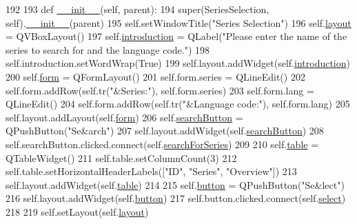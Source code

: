 \begin{DoxyCode}
192 
193         \textcolor{keyword}{def }\hyperlink{classmovies2hdd_1_1gui_1_1_series_selection_aa7aee53dd5df33e036a5bbffe99a903b}{\_\_init\_\_}(self, parent):
194             super(SeriesSelection, self).\hyperlink{classmovies2hdd_1_1gui_1_1_series_selection_aa7aee53dd5df33e036a5bbffe99a903b}{\_\_init\_\_}(parent)
195             self.setWindowTitle(\textcolor{stringliteral}{"Series Selection"})
196             self.\hyperlink{classmovies2hdd_1_1gui_1_1_series_selection_a1d4759f70508c7fbcbf5ce849d6cee76}{layout} = QVBoxLayout()
197             self.\hyperlink{classmovies2hdd_1_1gui_1_1_series_selection_ae741cee9fe3b6d64c1e62413c063d7b1}{introduction} = QLabel(\textcolor{stringliteral}{"Please enter the name of the series to search for and
       the language code."})
198             self.introduction.setWordWrap(\textcolor{keyword}{True})
199             self.layout.addWidget(self.\hyperlink{classmovies2hdd_1_1gui_1_1_series_selection_ae741cee9fe3b6d64c1e62413c063d7b1}{introduction})
200             self.\hyperlink{classmovies2hdd_1_1gui_1_1_series_selection_a514dd2b23706781594fe9d9886a28218}{form} = QFormLayout()
201             self.form.series = QLineEdit()
202             self.form.addRow(self.tr(\textcolor{stringliteral}{"&Series:"}), self.form.series)
203             self.form.lang = QLineEdit()
204             self.form.addRow(self.tr(\textcolor{stringliteral}{"&Language code:"}), self.form.lang)
205             self.layout.addLayout(self.\hyperlink{classmovies2hdd_1_1gui_1_1_series_selection_a514dd2b23706781594fe9d9886a28218}{form})
206             self.\hyperlink{classmovies2hdd_1_1gui_1_1_series_selection_a3ef4927decef147a124124515ab71114}{searchButton} = QPushButton(\textcolor{stringliteral}{"Se&arch"})
207             self.layout.addWidget(self.\hyperlink{classmovies2hdd_1_1gui_1_1_series_selection_a3ef4927decef147a124124515ab71114}{searchButton})
208             self.searchButton.clicked.connect(self.\hyperlink{classmovies2hdd_1_1gui_1_1_series_selection_a59d9d53410754b1a797e2ec645c57591}{searchForSeries})
209 
210             self.\hyperlink{classmovies2hdd_1_1gui_1_1_series_selection_ac297f3ae5b7cbba9f01a3ebf7fa2fbb5}{table} = QTableWidget()
211             self.table.setColumnCount(3)
212             self.table.setHorizontalHeaderLabels([\textcolor{stringliteral}{"ID"}, \textcolor{stringliteral}{"Series"}, \textcolor{stringliteral}{"Overview"}])
213             self.layout.addWidget(self.\hyperlink{classmovies2hdd_1_1gui_1_1_series_selection_ac297f3ae5b7cbba9f01a3ebf7fa2fbb5}{table})
214 
215             self.\hyperlink{classmovies2hdd_1_1gui_1_1_series_selection_ac43a1fd2985b12d7d42e5d3af24a5309}{button} = QPushButton(\textcolor{stringliteral}{"Se&lect"})
216             self.layout.addWidget(self.\hyperlink{classmovies2hdd_1_1gui_1_1_series_selection_ac43a1fd2985b12d7d42e5d3af24a5309}{button})
217             self.button.clicked.connect(self.\hyperlink{classmovies2hdd_1_1gui_1_1_series_selection_a97b0edb40452ba405e776132cae34997}{select})
218 
219             self.setLayout(self.\hyperlink{classmovies2hdd_1_1gui_1_1_series_selection_a1d4759f70508c7fbcbf5ce849d6cee76}{layout})

\end{DoxyCode}


